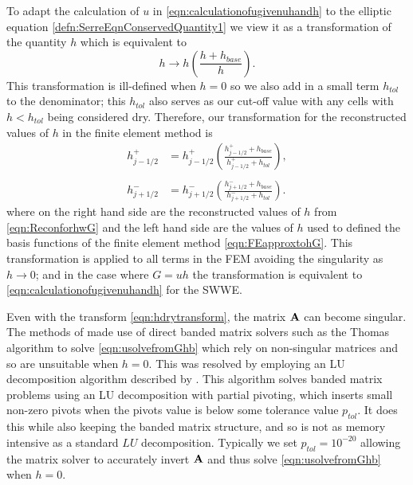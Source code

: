 To adapt the calculation of $u$ in \eqref{eqn:calculationofugivenuhandh} to the elliptic equation \eqref{defn:SerreEqnConservedQuantity1} we view it as a transformation of the quantity $h$ which is equivalent to
\begin{equation}
h \rightarrow h \left( \frac{h + h_{base}}{h} \right).
\end{equation}
This transformation is ill-defined when $h = 0$ so we also add in a  small term $h_{tol}$ to the denominator; this $h_{tol}$ also serves as our cut-off value with any cells with $h < h_{tol}$ being considered dry. Therefore, our transformation for the reconstructed values of $h$ in the finite element method is
\begin{subequations}
	\begin{align}
	h^+_{j-1/2} & = h^+_{j-1/2} \left(\frac{ h^+_{j-1/2}  + h_{base}}{h^+_{j-1/2} + h_{tol}}\right) , \\ \nonumber\\
	h^-_{j+1/2} & = h^-_{j+1/2} \left(\frac{ h^-_{j+1/2}  + h_{base}}{h^-_{j+1/2} + h_{tol}}\right).
	\end{align} 
	\label{eqn:hdrytransform}
\end{subequations}
where on the right hand side are the reconstructed values of $h$ from \eqref{eqn:ReconforhwG} and the left hand side are the values of $h$ used to defined the basis functions of the finite element method \eqref{eqn:FEapproxtohG}. This transformation is applied to all terms in the FEM avoiding the singularity as $h \rightarrow 0$; and in the case where $G = uh$ the transformation is equivalent to \eqref{eqn:calculationofugivenuhandh} for the SWWE.

Even with the transform \eqref{eqn:hdrytransform}, the matrix $\mathbf{A}$ can become singular.
The methods of \citet{Zoppou-etal-2017} made use of direct banded matrix solvers such as the Thomas algorithm \cite{Conte-DeBoor-1980} to solve \eqref{eqn:usolvefromGhb} which rely on non-singular matrices and so are unsuitable when $h = 0$. This was resolved by employing an LU decomposition algorithm described by \citet{NumRecC-1996}. This algorithm solves banded matrix problems using an LU decomposition with partial pivoting, which inserts small non-zero pivots when the pivots value is below some tolerance value $p_{tol}$. It does this while also keeping the banded matrix structure, and so is not as memory intensive as a standard $LU$ decomposition. Typically we set $p_{tol} = 10^{-20}$ allowing the matrix solver to accurately invert $\mathbf{A}$ and thus solve \eqref{eqn:usolvefromGhb} when $h = 0$. 

